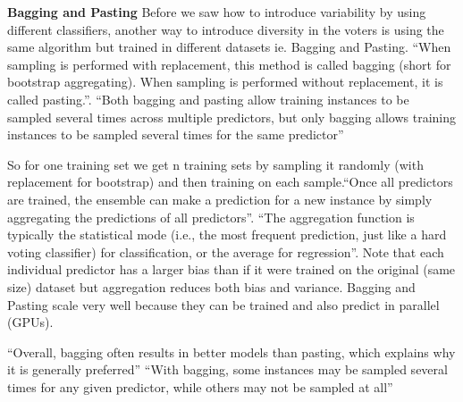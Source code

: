 \documentclass[11pt]{article}
\begin{document}



\textbf{Bagging and Pasting}
Before we saw how to introduce variability by using different classifiers, another way to introduce diversity in the voters is using the same algorithm but trained in different datasets ie. Bagging and Pasting.
“When sampling is performed with replacement, this method is called bagging (short for bootstrap aggregating). When sampling is performed without replacement, it is called pasting.”. “Both bagging and pasting allow training instances to be sampled several times across multiple predictors, but only bagging allows training instances to be sampled several times for the same predictor” \cite{geron2017hands}

So for one training set we get n training sets by sampling it randomly (with replacement for bootstrap) and then training on each sample.“Once all predictors are trained, the ensemble can make a prediction for a new instance by simply aggregating the predictions of all predictors”. “The aggregation function is typically the statistical mode (i.e., the most frequent prediction, just like a hard voting classifier) for classification, or the average for regression”. Note that each individual predictor has a larger bias than if it were trained on the original (same size) dataset but aggregation reduces both bias and variance.
Bagging and Pasting scale very well because they can be trained and also predict in parallel (GPUs).



“Overall, bagging often results in better models than pasting, which explains why it is generally preferred”
“With bagging, some instances may be sampled several times for any given predictor, while others may not be sampled at all”
\end{document}
